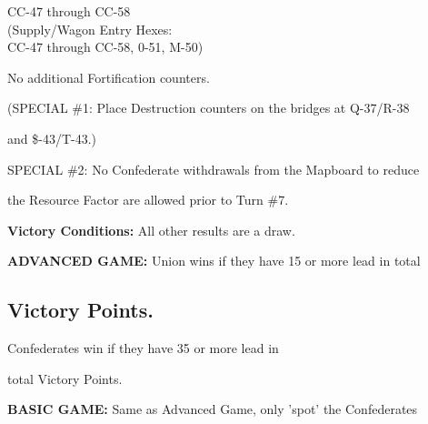 \begin{scenariodata}
CC-47 through CC-58\\
(Supply/Wagon Entry Hexes:\\
CC-47 through CC-58, 0-51, M-50)\\
\end{scenariodata}

\begin{scenariodata}
No additional Fortification counters.\\
\end{scenariodata}

\begin{scenariodata}
(SPECIAL \#1: Place Destruction counters on the bridges at Q-37/R-38\\
\end{scenariodata}

and \$-43/T-43.)

\begin{scenariodata}
SPECIAL \#2: No Confederate withdrawals from the Mapboard to reduce\\
\end{scenariodata}

the Resource Factor are allowed prior to Turn \#7.

\begin{scenariodata}
\textbf{Victory Conditions:} All other results are a draw.\\
\end{scenariodata}

\begin{scenariodata}
\textbf{ADVANCED GAME:} Union wins if they have 15 or more lead in total\\
\end{scenariodata}

\subsection*{Victory Points.}

\begin{scenariodata}
Confederates win if they have 35 or more lead in\\
\end{scenariodata}

total Victory Points.

\begin{scenariodata}
\textbf{BASIC GAME:} Same as Advanced Game, only 'spot' the Confederates\\
\end{scenariodata}

